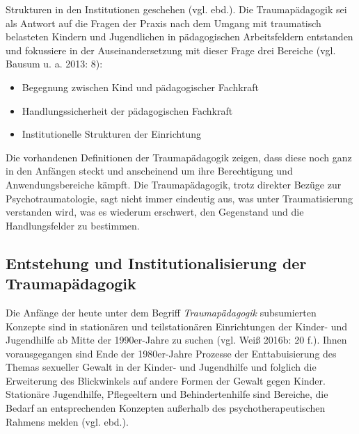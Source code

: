 Strukturen in den Institutionen geschehen (vgl. ebd.). Die Traumapädagogik sei als Antwort auf die Fragen der Praxis nach dem Umgang mit traumatisch belasteten Kindern und Jugendlichen in pädagogischen Arbeitsfeldern entstanden und fokussiere in der Auseinandersetzung mit dieser Frage drei Bereiche (vgl. Bausum u. a. 2013: 8):

\begin{itemize}
\item Begegnung zwischen Kind und pädagogischer Fachkraft 
\item Handlungssicherheit der pädagogischen Fachkraft 
\item Institutionelle Strukturen der Einrichtung
\end{itemize}

Die vorhandenen Definitionen der Traumapädagogik zeigen, dass diese noch ganz in den Anfängen steckt und anscheinend um ihre Berechtigung und Anwendungsbereiche kämpft. Die Traumapädagogik, trotz direkter Bezüge zur Psychotraumatologie, sagt nicht immer eindeutig aus, was unter Traumatisierung verstanden wird, was es wiederum erschwert, den Gegenstand und die Handlungsfelder zu bestimmen.

\subsection{Entstehung und Institutionalisierung der Traumapädagogik}
Die Anfänge der heute unter dem Begriff \textit{Traumapädagogik} subsumierten Konzepte sind in stationären und teilstationären Einrichtungen der Kinder- und Jugendhilfe ab Mitte der 1990er-Jahre zu suchen (vgl. Weiß 2016b: 20 f.). Ihnen vorausgegangen sind Ende der 1980er-Jahre Prozesse der Enttabuisierung des Themas sexueller Gewalt in der Kinder- und Jugendhilfe und folglich die Erweiterung des Blickwinkels auf andere Formen der Gewalt gegen Kinder. Stationäre Jugendhilfe, Pflegeeltern und Behindertenhilfe sind Bereiche, die Bedarf an entsprechenden Konzepten außerhalb des psychotherapeutischen Rahmens melden (vgl. ebd.).

